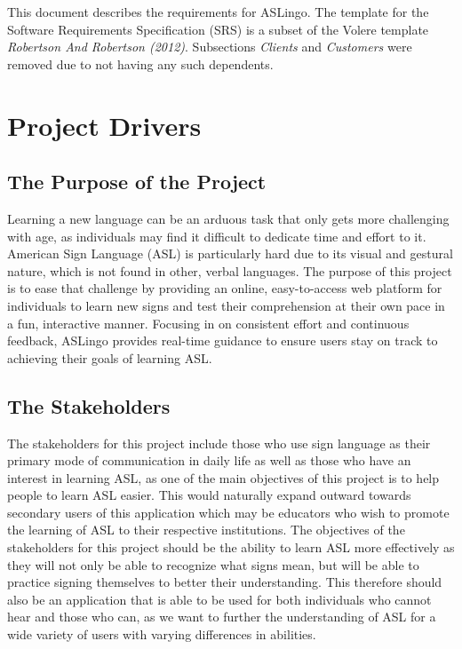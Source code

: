 \documentclass[12pt, titlepage]{article}
\begin{document}
\newpage


This document describes the requirements for ASLingo. The template for the Software
Requirements Specification (SRS) is a subset of the Volere
template \textit{Robertson And Robertson (2012)}.  Subsections \textit{Clients} and \textit{Customers} were removed due to not having any such dependents.

\section{Project Drivers}

\subsection{The Purpose of the Project}

Learning a new language can be an arduous task that only gets more challenging
with age, as individuals may find it difficult to dedicate time and effort to
it. American Sign Language (ASL) is particularly hard due to its visual and
gestural nature, which is not found in other, verbal languages. The purpose of this project is
to ease that challenge by providing an online, easy-to-access web platform for
individuals to learn new signs and test their comprehension at their own pace
in a fun, interactive manner. Focusing in on consistent effort and continuous
feedback, ASLingo provides real-time guidance to ensure users stay on track to
achieving their goals of learning ASL.

\subsection{The Stakeholders}

 The stakeholders for this project include those who use sign language as their primary mode of communication in daily life as well as those who have an interest in learning ASL, as one of the main objectives of this project is to help people to learn ASL easier. This would naturally expand outward towards secondary users of this application which may be educators who wish to promote the learning of ASL to their respective institutions. The objectives of the stakeholders for this project should be the ability to learn ASL more effectively as they will not only be able to recognize what signs mean, but will be able to practice signing themselves to better their understanding. This therefore should also be an application that is able to be used for both individuals who cannot hear and those who can, as we want to further the understanding of ASL for a wide variety of users with varying differences in abilities. 
\end{document}
